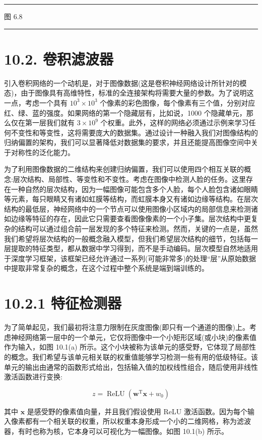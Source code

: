 \documentclass[10pt]{report}
\newcommand{\HRule}{\begin{center}\rule{0.9\linewidth}{0.2mm}\end{center}}
\begin{document}
\HRule

图 6.8

\HRule

\section*{10.2. 卷积滤波器}

引入卷积网络的一个动机是，对于图像数据(这是卷积神经网络设计所针对的模态)，由于图像具有高维特性，标准的全连接架构将需要大量的参数。为了说明这一点，考虑一个具有 \({10}^{3} \times  {10}^{3}\) 个像素的彩色图像，每个像素有三个值，分别对应红、绿、蓝的强度。如果网络的第一个隐藏层有，比如说，1000 个隐藏单元，那么仅在第一层我们就有 \(3 \times  {10}^{9}\) 个权重。此外，这样的网络必须通过示例来学习任何不变性和等变性，这将需要庞大的数据集。通过设计一种融入我们对图像结构的归纳偏置的架构，我们可以显著降低对数据集的要求，并且还能提高图像空间中关于对称性的泛化能力。

为了利用图像数据的二维结构来创建归纳偏置，我们可以使用四个相互关联的概念:层次结构、局部性、等变性和不变性。考虑在图像中检测人脸的任务。这里存在一种自然的层次结构，因为一幅图像可能包含多个人脸，每个人脸包含诸如眼睛等元素，每只眼睛又有诸如虹膜等结构，而虹膜本身又有诸如边缘等结构。在层次结构的最低层，神经网络中的一个节点可以使用图像小区域内的局部信息来检测诸如边缘等特征的存在，因此它只需要查看图像像素的一个小子集。层次结构中更复杂的结构可以通过组合前一层发现的多个特征来检测。然而，关键的一点是，虽然我们希望将层次结构的一般概念融入模型，但我们希望层次结构的细节，包括每一层提取的特征类型，都从数据中学习得到，而不是手动编码。层次模型自然地适用于深度学习框架，该框架已经允许通过一系列(可能非常多)的处理“层”从原始数据中提取非常复杂的概念，在这个过程中整个系统是端到端训练的。

\section*{10.2.1 特征检测器}

为了简单起见，我们最初将注意力限制在灰度图像(即只有一个通道的图像)上。考虑神经网络第一层中的一个单元，它仅将图像中一个小矩形区域(或小块)的像素值作为输入，如图 10.1(a) 所示。这个小块被称为该单元的感受野，它体现了局部性的概念。我们希望与该单元相关联的权重值能够学习检测一些有用的低级特征。该单元的输出由通常的函数形式给出，包括输入值的加权线性组合，随后使用非线性激活函数进行变换:

\[
z = \operatorname{ReLU}\left( {{\mathbf{w}}^{\mathrm{T}}\mathbf{x} + {w}_{0}}\right)  \tag{10.1}
\]

其中 \(\mathbf{x}\) 是感受野的像素值向量，并且我们假设使用 ReLU 激活函数。因为每个输入像素都有一个相关联的权重，所以权重本身形成一个小的二维网格，称为滤波器，有时也称为核，它本身可以可视化为一幅图像。如图 10.1(b) 所示。
\end{document}
